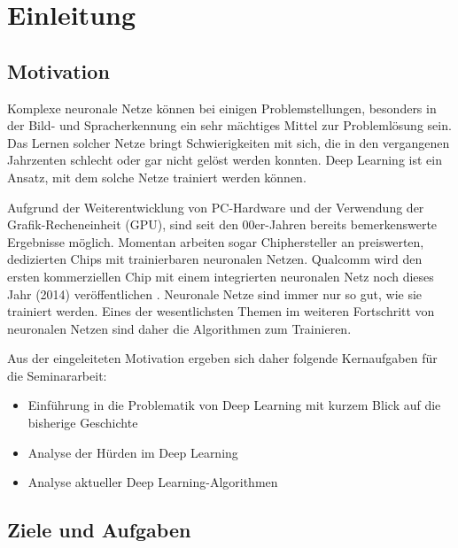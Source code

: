 \chapter{Einleitung}
\label{cha:einleitung}

\section{Motivation}

Komplexe neuronale Netze können bei einigen Problemstellungen, besonders in der Bild- und Spracherkennung ein sehr mächtiges Mittel zur Problemlösung sein. Das Lernen solcher Netze bringt Schwierigkeiten mit sich, die in den vergangenen Jahrzenten schlecht oder gar nicht gelöst werden konnten. Deep Learning ist ein Ansatz, mit dem solche Netze trainiert werden können.

Aufgrund der Weiterentwicklung von PC-Hardware und der Verwendung der Grafik-Recheneinheit (GPU), sind seit den 00er-Jahren bereits bemerkenswerte Ergebnisse möglich. Momentan arbeiten sogar Chiphersteller an preiswerten, dedizierten Chips mit trainierbaren neuronalen Netzen. Qualcomm wird den ersten kommerziellen Chip mit einem integrierten neuronalen Netz noch dieses Jahr (2014) veröffentlichen \citep{Qualcomm}. Neuronale Netze sind immer nur so gut, wie sie trainiert werden. Eines der wesentlichsten Themen im weiteren Fortschritt von neuronalen Netzen sind daher die Algorithmen zum Trainieren.

Aus der eingeleiteten Motivation ergeben sich daher folgende Kernaufgaben für die Seminararbeit:


\begin{itemize}
\item Einführung in die Problematik von Deep Learning mit kurzem Blick auf die bisherige Geschichte
\item Analyse der Hürden im Deep Learning
\item Analyse aktueller Deep Learning-Algorithmen
\end{itemize}

\section{Ziele und Aufgaben}
 
